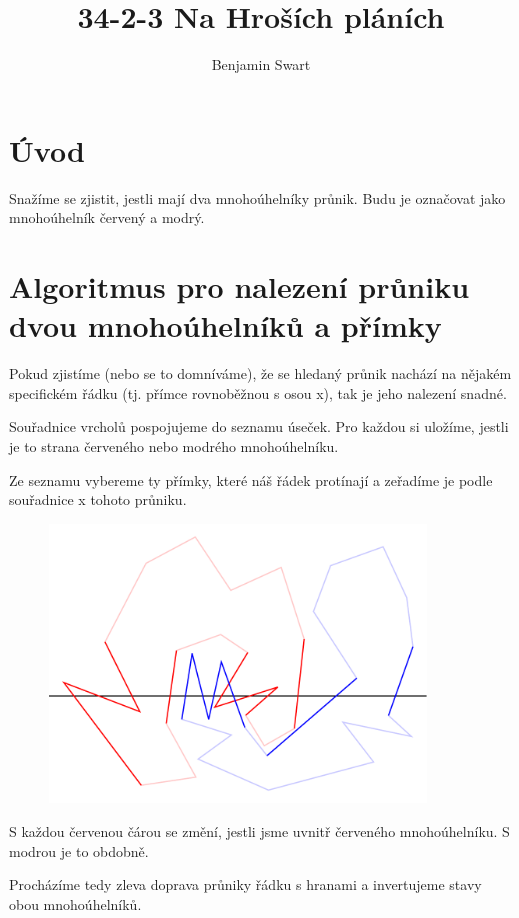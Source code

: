 \documentclass{article}
\title{34-2-3 Na Hroších pláních}
\author{Benjamin Swart}
\begin{document}
\maketitle

\section*{Úvod}

Snažíme se zjistit, jestli mají dva mnohoúhelníky průnik. Budu je označovat jako mnohoúhelník červený a modrý.

\section*{Algoritmus pro nalezení průniku dvou mnohoúhelníků a přímky}
\label{sec:findOnLine}

Pokud zjistíme (nebo se to domníváme), že se hledaný průnik nachází na nějakém specifickém řádku (tj. přímce rovnoběžnou s osou x), tak je jeho nalezení snadné.

Souřadnice vrcholů pospojujeme do seznamu úseček. Pro každou si uložíme, jestli je to strana červeného nebo modrého mnohoúhelníku.

Ze seznamu vybereme ty přímky, které náš řádek protínají a zeřadíme je podle souřadnice x tohoto průniku.

\begin{figure}[h] \centering
    \includegraphics[width=10cm]{images/on-line.000.pdf}
\end{figure}

S každou červenou čárou se změní, jestli jsme uvnitř červeného mnohoúhelníku. S modrou je to obdobně.

Procházíme tedy zleva doprava průniky řádku s hranami a invertujeme stavy obou mnohoúhelníků.
\end{document}
